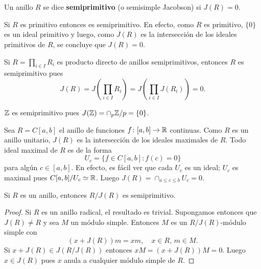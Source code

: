 \chapter{}


\begin{definition}
	Un anillo $R$ se dice \textbf{semiprimitivo} (o semisimple Jacobson) si
	$J(R)=0$.
\end{definition}

\begin{example}
	Si $R$ es primitivo entonces es semiprimitivo. En efecto, como $R$ es
	primitivo, $\{0\}$ es un ideal primitivo y luego, como $J(R)$ es la
	intersección de los ideales primitivos de $R$, se concluye que $J(R)=0$.
\end{example}

\begin{example}
	Si $R=\prod_{i\in I}R_i$ es producto directo de anillos semiprimitivos,
	entonces $R$ es semiprimitivo pues 
	\[
		J(R)=J\left(\prod_{i\in I}R_i\right)=J\left(\prod_{i\in I}J(R_i)\right)=0.
	\]
\end{example}

\begin{example}
	$\mathbb{Z}$ es semiprimitivo pues $J(\mathbb{Z})=\cap_{p}\mathbb{Z}/p=\{0\}$.
\end{example}

\begin{example}
	Sea $R=C[a,b]$ el anillo de funciones $f\colon [a,b]\to\mathbb{R}$ continuas. Como
	$R$ es un anillo unitario, $J(R)$ es la intersección de los ideales
	maximales de $R$. Todo ideal maximal de $R$ es de la forma
	\[
		U_c=\{f\in C[a,b]:f(c)=0\}
	\]
	para algún $c\in[a,b]$. En efecto, es fácil ver que cada $U_c$ es un ideal;
	$U_c$ es maximal pues $C[a,b]/U_c\simeq\mathbb{R}$.  Luego $J(R)=\cap_{a\leq c\leq
	b}U_c=0$.
\end{example}

\begin{theorem}
	\label{thm:semiprimitivo}
	Si $R$ es un anillo, entonces $R/J(R)$ es semiprimitivo. 
\end{theorem}

\begin{proof}
	Si $R$ es un anillo radical, el resultado es trivial. Supongamos entonces
	que $J(R)\ne R$ y sea $M$ un módulo simple. Entonces $M$ es un
	$R/J(R)$-módulo simple con
	\[
		(x+J(R))m=xm,\quad
		x\in R,\,m\in M.
	\]
	Si $x+J(R)\in J(R/J(R))$ entonces $xM=(x+J(R))M=0$. Luego $x\in J(R)$ pues
	$x$ anula a cualquier módulo simple de $R$.
\end{proof}

